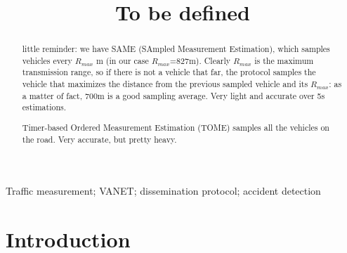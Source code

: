 \documentclass[conference]{IEEEtran}
\begin{document}
\title{To be defined}


\author{

}

\maketitle


\begin{abstract}
little reminder: we have SAME (SAmpled Measurement Estimation), which samples vehicles every $R_{max}$ m (in our case $R_{max}$=827m). Clearly $R_{max}$ is the maximum transmission range, so if there is not a vehicle that far, the protocol samples the vehicle that maximizes the distance from the previous sampled vehicle and its $R_{max}$: as a matter of fact, 700m is a good sampling average. Very light and accurate over 5s estimations.

Timer-based Ordered Measurement Estimation (TOME) samples all the vehicles on the road. Very accurate, but pretty heavy.
\end{abstract}


\begin{IEEEkeywords}
Traffic measurement; VANET; dissemination protocol; accident detection
\end{IEEEkeywords}


\IEEEpeerreviewmaketitle







\section{Introduction}
\label{sec:intro}
\end{document}
